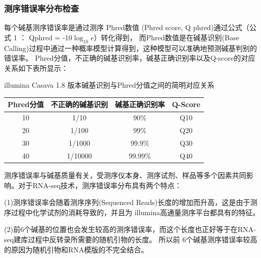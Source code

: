 \documentclass[10pt, oneside,a4paper]{article}
\begin{document}
\subsubsection{测序错误率分布检查}
每个碱基测序错误率是通过测序 Phred数值 (Phred score, Q phred)通过公式（公式 1 ： Qphred = -10$\log_{10}e$）转化得到，
而Phred数值是在碱基识别(Base Calling)过程中通过一种概率模型计算得到，这种模型可以准确地预测碱基判别的错误率。
Phred分值，不正确的碱基识别率，碱基正确识别率以及Q-score的对应关系如下表所显示：\par
illumina Casava 1.8 版本碱基识别与Phred分值之间的简明对应关系\par
\vspace{3 mm}
\begin{center}
\begin{tabularx}{110mm}{cccc}
\hline
\textbf{Phred分值} & \textbf{不正确的碱基识别} & \textbf{碱基正确识别率} & \textbf{Q-Score} \\
\hline
10 & 1/10 & 90\% & Q10 \\
20 & 1/100 & 99\% & Q20 \\
30 & 1/1000 & 99.9\% & Q30 \\
40 & 1/10000 & 99.99\% & Q40 \\
\hline
\end{tabularx}
\end{center}
\vspace{5 mm}
\par
测序错误率与碱基质量有关，受测序仪本身、测序试剂、样品等多个因素共同影响。对于RNA-seq技术，测序错误率分布具有两个特点：\par
(1)测序错误率会随着测序序列(Sequenced Reads)长度的增加而升高，这是由于测序过程中化学试剂的消耗导致的，并且为
illumina高通量测序平台都具有的特征。\par
(2)前6个碱基的位置也会发生较高的测序错误率，而这个长度也正好等于在RNA-seq建库过程中反转录所需要的随机引物的长度。
所以前 6个碱基测序错误率较高的原因为随机引物和RNA模版的不完全结合。\par
\end{document}
